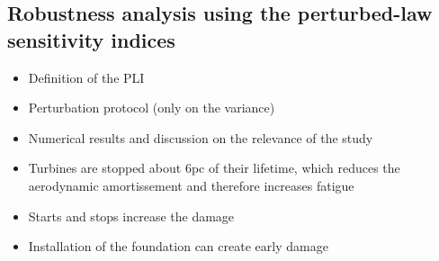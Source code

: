 \subsection{Robustness analysis using the perturbed-law sensitivity indices}
\begin{itemize}
    \item Definition of the PLI
    \item Perturbation protocol (only on the variance)
    \item Numerical results and discussion on the relevance of the study  
    \item Turbines are stopped about 6pc of their lifetime, which reduces the aerodynamic amortissement and therefore increases fatigue
    \item Starts and stops increase the damage
    \item Installation of the foundation can create early damage
\end{itemize}


